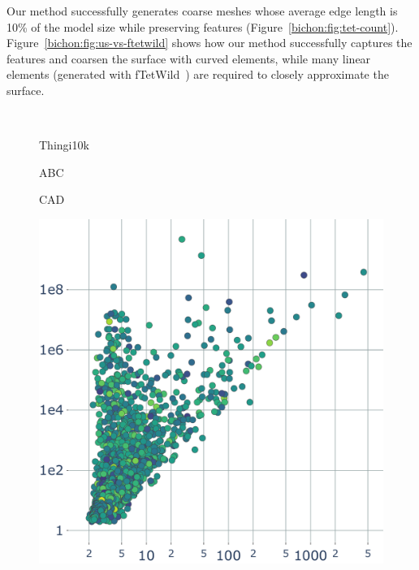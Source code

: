 Our method successfully {generates} coarse meshes whose average edge length is 10\% of the model size while preserving features (Figure~\ref{bichon:fig:tet-count}).
Figure~\ref{bichon:fig:us-vs-ftetwild} shows how our method successfully {captures} the features and coarsen the surface with curved elements, while many linear elements (generated with fTetWild~\cite{Hu:2020:fTetWild}) are required to closely approximate the surface.


\begin{figure}
    \centering
    \parbox{0.02\linewidth}{~}\hfill\hfill
    \parbox{.3\linewidth}{\centering Thingi10k}\hfill
    \parbox{.3\linewidth}{\centering ABC}\hfill
    \parbox{.3\linewidth}{\centering CAD}\par
    \parbox{0.02\linewidth}{\centering{}}\hfill\hfill
    \parbox{.3\linewidth}{\includegraphics[width=\linewidth]{curve_meshing_in_shell_tex/figs/stats/energy_Thingi10k}}\hfill

\end{figure}
